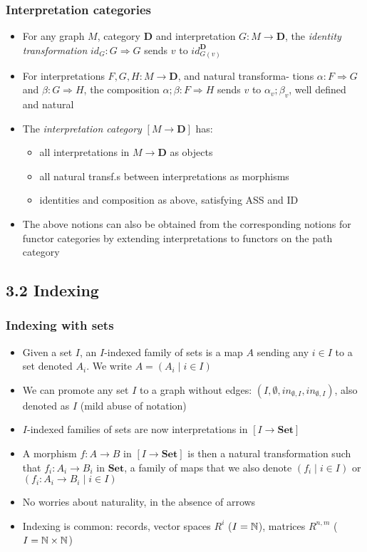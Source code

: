 \documentclass[handout]{beamer}
\newcommand{\To}{\Rightarrow}
\newcommand{\bfsf}[1]{{\boldsymbol{#1}}}
\newcommand{\Set}{\bfsf{Set}}
\newcommand{\DD}{\bfsf{D}}
\begin{document}
\frame
  {   
    \frametitle{Interpretation categories}\label{Ch3:interpretationcats}

 \begin{itemize}[<+->]
\item For any graph $M$,  category $\DD$ and interpretation $G: M\to\DD$, the 
\emph{identity transformation} $id_G : G\To G$ sends $v$ to $id^\DD_{G(v)}$
\item For interpretations $F,G,H: M\to\DD$, and natural
transforma- tions $\alpha: F\To G$ and $\beta:G\To H$, the composition
$\alpha;\beta: F\To H$ sends $v$ to $\alpha_v;\beta_v$, well defined and natural
 \item The \emph{interpretation category} $[M\to\DD]$ has:
   \begin{itemize}[<+->]
\item all interpretations in $M\to\DD$ as objects 
\item all natural transf.s  between interpretations as morphisms 
\item identities and composition as above, satisfying ASS and ID
   \end{itemize}
\item The above notions can also be obtained from the corresponding
notions for functor categories by extending interpretations
to functors on the path category
 \end{itemize}

 }

\subsection{3.2 Indexing}

\frame
  {   
    \frametitle{Indexing with sets}\label{Ch3:indexset}

 \begin{itemize}[<+->]
\item Given a set $I$, an $I$-indexed family of sets is a map $A$
sending any $i\in I$ to a set denoted $A_i$. We write $A=(A_i \mid i\in I)$
\item We can promote any set $I$ to a graph without edges: 
$(I,\emptyset,in_{\emptyset,I},in_{\emptyset,I})$, also denoted as $I$ (mild abuse of notation)
 \item $I$-indexed families of sets are now interpretations in $[I\to \Set]$
 \item A morphism $f: A\to B$ in $[I\to \Set]$ is then a natural transformation
such that $f_i: A_i \to B_i$ in $\Set$, a family of maps that we also denote
$(f_i \mid i\in I)$ or $(f_i: A_i\to B_i \mid i\in I)$
\item No worries about naturality, in the absence of arrows
\item Indexing is common: records, 
vector spaces $R^i$ ($I=\mathbb{N}$), matrices $R^{n,m}$ ($I={\mathbb{N}\times\mathbb{N}}$)
 \end{itemize}

 }
\end{document}
